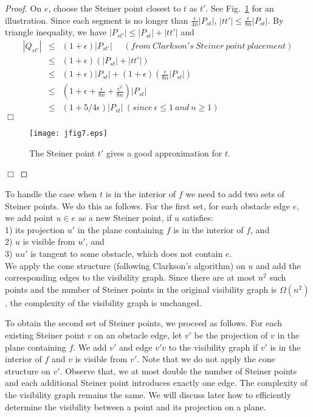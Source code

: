 \documentclass{llncs}
\begin{document}
\begin{proof}
On $e$, choose the Steiner point closest to $t$ as $t'$.
See Fig.~\ref{jfig7} for an illustration.
Since each segment is no longer than
$\frac{\epsilon}{4n}|P_{st}|$, $|tt'|\leq \frac{\epsilon}{8n}|P_{st}|$.
By triangle inequality, we have $|P_{st'}|\leq |P_{st}|+|tt'|$ and
\\
\begin{eqnarray*}
|Q_{st'}|       &\leq& (1+\epsilon)|P_{st'}|~~~~~~(from\ Clarkson's\ Steiner\ point\ placement) \\
                &\leq& (1+\epsilon)(|P_{st}|+|tt'|) \\
                &\leq& (1+\epsilon)|P_{st}|+(1+\epsilon)(\frac{\epsilon}{8n}|P_{st}|) \\
                &\leq& (1+\epsilon+\frac{\epsilon}{8n}+\frac{{\epsilon}^2}{8n})|P_{st}|\\
                &\leq& (1+5/4\epsilon)|P_{st}|~(since \ \epsilon \leq 1 \ and \ n \ge 1)
\end{eqnarray*}
\hfill $\Box$


\begin{figure}\begin{center}
    \leavevmode
\texttt{[image: jfig7.eps]}
    \caption{The Steiner point $t'$ gives a good approximation for $t$.}
    \label{jfig7}
    \end{center}
\end{figure}
\hfill $\Box$
\end{proof}

To handle the case when $t$ is in the interior of $f$ we need to add two sets of Steiner points.
We do this as follows.
For the first set, for each obstacle edge $e$, we add point $u\in e$ as a new Steiner point, if $u$ satisfies:\\
1) its projection $u'$ in the plane containing $f$ is in the interior of $f$, and \\
2) $u$ is visible from $u'$, and\\
3) $uu'$ is tangent to some obstacle, which does not contain $e$. \\
We apply the cone structure (following Clarkson's algorithm) on $u$ and add the corresponding edges to the visibility graph. Since there are at most $n^2$ such points and the number of Steiner points in the original visibility graph is $\Omega(n^2)$, the complexity of the visibility graph is unchanged.

To obtain the second set of Steiner points, we proceed as follows.
For each existing Steiner point $v$ on an obstacle edge, let $v'$ be the projection of $v$ in the plane containing $f$. We add $v'$ and edge $v'v$ to the visibility graph if $v'$ is in the interior of $f$ and $v$ is visible from $v'$. Note that we do not apply the cone structure on $v'$. Observe that, we at most double the number of Steiner points
and each additional Steiner point introduces exactly one edge. The complexity of the visibility graph remains the same. We will discuss later how to efficiently determine the visibility between a point and its projection on a plane.
\end{document}

